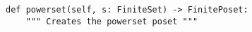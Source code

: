 \begin{verbatim}
def powerset(self, s: FiniteSet) -> FinitePoset:
    """ Creates the powerset poset """
\end{verbatim}